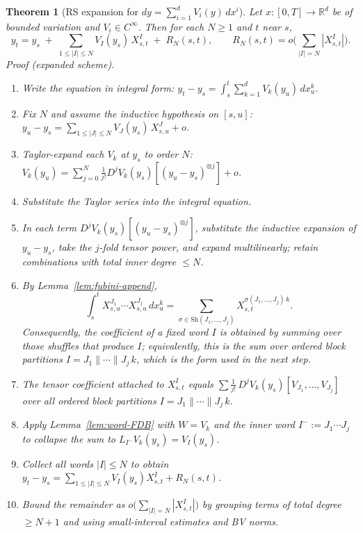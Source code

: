 \documentclass[12pt]{article}
\newtheorem{theorem}{Theorem}[section]
\theoremstyle{remark}
\begin{document}
\begin{theorem}[RS expansion for $dy=\sum_{i=1}^d V_i(y)\,dx^i$]\label{thm:multidim-CN}
Let $x:[0,T]\to\mathbb{R}^d$ be of bounded variation and $V_i\in C^\infty$.
Then for each $N\ge1$ and $t$ near $s$,
\[
\boxed{\;
y_t
= y_s \;+\; \sum_{1\le |I|\le N} V_I(y_s)\,X^I_{s,t}
\;+\; R_N(s,t),
\qquad R_N(s,t)=o\!\Big(\sum_{|I|=N} |X^I_{s,t}|\Big).
\;}
\]
\emph{Proof (expanded scheme).}
\begin{enumerate}[leftmargin=*, itemsep=0.25em]
\item Write the equation in integral form: $y_t-y_s=\int_s^t \sum_{k=1}^d V_k(y_u)\,dx^k_u$.
\item Fix $N$ and assume the inductive hypothesis on $[s,u]$: $y_u-y_s=\sum_{1\le |J|\le N} V_J(y_s)\,X^J_{s,u}+o$.
\item Taylor-expand each $V_k$ at $y_s$ to order $N$: $V_k(y_u)=\sum_{j=0}^{N}\frac{1}{j!}D^{j}V_k(y_s)[(y_u-y_s)^{\otimes j}]+o$.
\item Substitute the Taylor series into the integral equation.
\item In each term $D^{j}V_k(y_s)[(y_u-y_s)^{\otimes j}]$, substitute the inductive expansion of $y_u-y_s$, take the $j$-fold tensor power, and expand multilinearly; retain combinations with total inner degree $\le N$.
\item
By Lemma~\ref{lem:fubini-append},
\[
\int_s^t X^{J_1}_{s,u}\cdots X^{J_j}_{s,u}\,dx^k_u
=
\sum_{\sigma\in\mathrm{Sh}(J_1,\ldots,J_j)}
X^{\sigma(J_1,\ldots,J_j)\,k}_{s,t}.
\]
Consequently, the coefficient of a fixed word $I$ is obtained by summing over those shuffles that produce $I$; equivalently, this is the sum over \emph{ordered block partitions} $I=J_1\|\cdots\|J_j\,k$, which is the form used in the next step.
\item The tensor coefficient attached to $X^{I}_{s,t}$ equals $\sum \frac{1}{j!}\,D^{j}V_k(y_s)[V_{J_1},\dots,V_{J_j}]$ over all ordered block partitions $I=J_1\|\cdots\|J_j\,k$.
\item Apply Lemma~\ref{lem:word-FDB} with $W=V_k$ and the inner word $I^-:=J_1\cdots J_j$ to collapse the sum to $L_{I^-}V_k(y_s)=V_{I}(y_s)$.
\item Collect all words $|I|\le N$ to obtain $y_t-y_s=\sum_{1\le |I|\le N} V_I(y_s)X^I_{s,t}+R_N(s,t)$.
\item Bound the remainder as $o\!\big(\sum_{|I|=N}|X^I_{s,t}|\big)$ by grouping terms of total degree $\ge N+1$ and using small-interval estimates and BV norms.
\end{enumerate}
\end{theorem}
\end{document}
